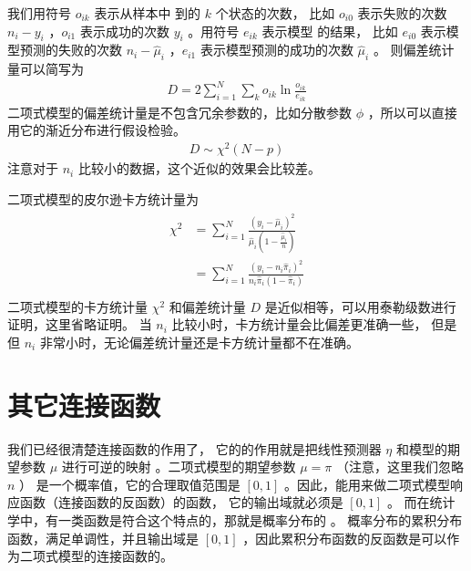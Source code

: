 \documentclass[letterpaper,10pt,english]{sphinxmanual}
\begin{document}
我们用符号 \(o_{ik}\) 表示从样本中  到的 \(k\) 个状态的次数，
比如 \(o_{i0}\) 表示失败的次数 \(n_i-y_i\)
，\(o_{i1}\) 表示成功的次数 \(y_i\)
。用符号 \(e_{ik}\) 表示模型  的结果，
比如 \(e_{i0}\) 表示模型预测的失败的次数 \(n_i-\hat{\mu}_i\)
，\(e_{i1}\) 表示模型预测的成功的次数 \(\hat{\mu}_i\) 。
则偏差统计量可以简写为
\begin{equation}\label{equation:二项模型/content:二项模型/content:37}
\begin{split}D = 2\sum_{i=1}^N  \sum_{k} o_{ik} \ln \frac{o_{ik}}{e_{ik}}\end{split}
\end{equation}
二项式模型的偏差统计量是不包含冗余参数的，比如分散参数 \(\phi\)
，所以可以直接用它的渐近分布进行假设检验。
\begin{equation}\label{equation:二项模型/content:二项模型/content:38}
\begin{split}D \sim \chi^2(N-p)\end{split}
\end{equation}
注意对于 \(n_i\) 比较小的数据，这个近似的效果会比较差。

二项式模型的皮尔逊卡方统计量为
\begin{align}\label{equation:二项模型/content:二项模型/content:39}\!\begin{aligned}
\chi^2 &= \sum_{i=1}^N \frac{(y_i - \hat{\mu}_i)^2}{ \hat{\mu}_i(1-\frac{\hat{\mu}_i}{n})}\\
&= \sum_{i=1}^N \frac{(y_i - n_i\hat{\pi}_i)^2}{ n_i\hat{\pi}_i(1-\hat{\pi}_i)}\\
\end{aligned}\end{align}
二项式模型的卡方统计量 \(\chi^2\) 和偏差统计量 \(D\)
是近似相等，可以用泰勒级数进行证明，这里省略证明。
当 \(n_i\) 比较小时，卡方统计量会比偏差更准确一些，
但是但 \(n_i\) 非常小时，无论偏差统计量还是卡方统计量都不在准确。


\section{其它连接函数}
\label{\detokenize{_u4e8c_u9879_u6a21_u578b/content:id10}}
我们已经很清楚连接函数的作用了，
它的的作用就是把线性预测器 \(\eta\)
和模型的期望参数 \(\mu\) 进行可逆的映射
。二项式模型的期望参数 \(\mu=\pi\) （注意，这里我们忽略 \(n\) ）
是一个概率值，它的合理取值范围是 \([0,1]\)
。因此，能用来做二项式模型响应函数（连接函数的反函数）的函数，
它的输出域就必须是 \([0,1]\) 。
而在统计学中，有一类函数是符合这个特点的，那就是概率分布的  。
概率分布的累积分布函数，满足单调性，并且输出域是 \([0,1]\)
，因此累积分布函数的反函数是可以作为二项式模型的连接函数的。
\end{document}
